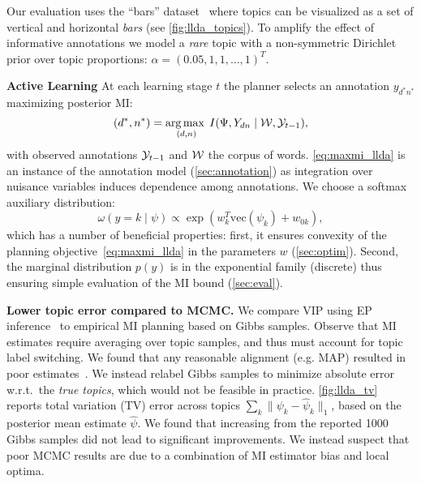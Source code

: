 Our evaluation uses the ``bars'' dataset~\citep{griffiths2004finding}
where topics can be visualized as a set of vertical and horizontal
\emph{bars} (see \FIG\ref{fig:llda_topics}).  To amplify the effect of
informative annotations we model a \emph{rare} topic with a
non-symmetric Dirichlet prior over topic proportions: $\alpha = (0.05, 1, 1,
\ldots, 1)^T$.


\textbf{Active Learning} At each learning stage $t$ the planner
selects an annotation $y_{d^*n^*}$ maximizing posterior MI:
\begin{equation}
  (d^*,n^*) = \operatorname*{arg\,max\;}_{(d,n)} I(\Psi, Y_{dn} \mid \mathcal{W}, \mathcal{Y}_{t-1}),
  \label{eq:maxmi_llda}
\end{equation}
with observed annotations $\mathcal{Y}_{t-1}$ and $\mathcal{W}$ the corpus of
words.  \EQN\eqref{eq:maxmi_llda} is an instance of the annotation
model (\SEC\ref{sec:annotation}) as integration over nuisance
variables induces dependence among annotations.  We choose a softmax
auxiliary distribution:
\[
  \omega(y = k \mid \psi) \propto \exp( w_k^T \text{vec}(\psi_k) + w_{0k} ),
\]
which has a number of beneficial properties: first, it ensures
convexity of the planning objective~\eqref{eq:maxmi_llda} in the
parameters $w$ (\SEC\ref{sec:optim}).  Second, the marginal
distribution $p(y)$ is in the exponential family (discrete) thus
ensuring simple evaluation of the MI bound (\SEC\ref{sec:eval}).

\textbf{Lower topic error compared to MCMC.}  We compare VIP using EP
inference~\citep{broderick2013streaming} to empirical MI planning
based on Gibbs samples.  Observe that MI estimates require averaging
over topic samples, and thus must account for topic label switching.
We found that any reasonable alignment (e.g. MAP) resulted in poor
estimates~\citep{stephens2000dealing}.  We instead relabel Gibbs
samples to minimize absolute error w.r.t.~the \emph{true topics},
which would not be feasible in practice.  \FIG\ref{fig:llda_tv}
reports total variation (TV) error across topics $\sum_k \|\psi_k -
\hat{\psi}_k\|_1$, based on the posterior mean estimate $\hat{\psi}$.
We found that increasing from the reported 1000 Gibbs samples did not
lead to significant improvements.  We instead suspect that poor MCMC
results are due to a combination of MI estimator bias and local
optima.









